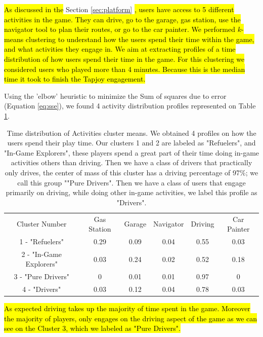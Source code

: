 \documentclass[preprint,authoryear,12pt]{elsarticle}
\newcommand{\hlc}[2][yellow]{ {\sethlcolor{#1} \hl{#2}} }
\begin{document}
\hlc[green]{
As discussed in the }
Section \ref{sec:platform}
\hlc[green]{
, users have access to 5 different activities in the game. They can drive, go to the garage, gas station, use the navigator tool to plan their routes, or go to the car painter. 
We performed $k$-means clustering to understand how the users spend their time within the game, and what activities they engage in. We aim at extracting profiles of a time distribution of how users spend their time in the game.
For this clustering we considered users who played more than 4 minutes. Because this is the median time it took to finish the Tapjoy engagement. 
} 

{ 
Using the 'elbow' heuristic to minimize the Sum of squares due to error (Equation \ref{eq:sse}), we found 4 activity distribution profiles represented on Table \ref{T:cluster_activities}.  
}
\begin{table}[!h]
	\renewcommand*{\arraystretch}{1.2}
	\caption{Time distribution of Activities cluster means. We obtained 4 profiles on how the users spend their play time. Our clusters 1 and 2 are labeled as "Refuelers", and "In-Game Explorers", these players spend a great part of their time doing in-game activities others than driving. Then we have a class of drivers that practically only drives, the center of mass of this cluster has a driving percentage of 97\%; we call this group ""Pure Drivers". Then we have a class of users that engage primarily on driving, while doing other in-game activities, we label this profile as "Drivers".   }
	\begin{center}
		\begin{tabular}{c|c|c|c|c|c}
			Cluster Number	& Gas Station &	Garage &	Navigator &	Driving &	Car Painter 	\\
			1 - "Refuelers" &	0.29 &	0.09 &	0.04 &	0.55 &	0.03\\
			2 - "In-Game Explorers" &	0.03 &	0.24 &	0.02 &	0.52 &	0.18 \\
			3 - "Pure Drivers" &	0 &	0.01 &	0.01 &	0.97 &	0  \\
			4 - "Drivers" &	0.03 &	0.12 &	0.04 &	0.78 &	0.03   \\
		\end{tabular}
	\end{center}
	\label{T:cluster_activities}
\end{table}

\hlc[green]{
As expected driving takes up the majority of time spent in the game. Moreover the majority of players, only engages on the driving aspect of the game as we can see on the Cluster 3, which we labeled as "Pure Drivers". 
}
\end{document}
